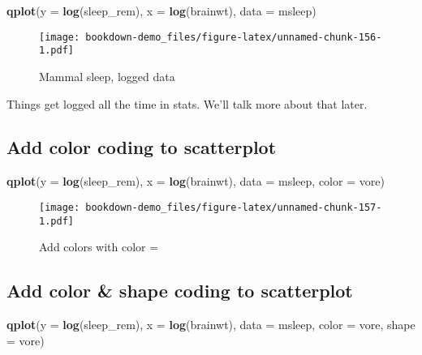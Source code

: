 \documentclass[]{book}
\newenvironment{Shaded}{\begin{snugshade}}{\end{snugshade}}
\newcommand{\KeywordTok}[1]{\textcolor[rgb]{0.13,0.29,0.53}{\textbf{#1}}}
\newcommand{\DataTypeTok}[1]{\textcolor[rgb]{0.13,0.29,0.53}{#1}}
\newcommand{\NormalTok}[1]{#1}
\theoremstyle{definition}
\theoremstyle{definition}
\theoremstyle{definition}
\theoremstyle{remark}
\begin{document}
\begin{Shaded}
\begin{Highlighting}[]
\KeywordTok{qplot}\NormalTok{(}\DataTypeTok{y =} \KeywordTok{log}\NormalTok{(sleep_rem),}
      \DataTypeTok{x =} \KeywordTok{log}\NormalTok{(brainwt), }
      \DataTypeTok{data =}\NormalTok{ msleep)}
\end{Highlighting}
\end{Shaded}

\begin{figure}
\centering
\texttt{[image: bookdown-demo\_files/figure-latex/unnamed-chunk-156-1.pdf]}
\caption{\label{fig:unnamed-chunk-156}Mammal sleep, logged data}
\end{figure}

Things get logged all the time in stats. We'll talk more about that
later.

\subsection{Add color coding to
scatterplot}\label{add-color-coding-to-scatterplot}

\begin{Shaded}
\begin{Highlighting}[]
\KeywordTok{qplot}\NormalTok{(}\DataTypeTok{y =} \KeywordTok{log}\NormalTok{(sleep_rem),}
      \DataTypeTok{x =} \KeywordTok{log}\NormalTok{(brainwt), }
      \DataTypeTok{data =}\NormalTok{ msleep,}
      \DataTypeTok{color =}\NormalTok{ vore)}
\end{Highlighting}
\end{Shaded}

\begin{figure}
\centering
\texttt{[image: bookdown-demo\_files/figure-latex/unnamed-chunk-157-1.pdf]}
\caption{\label{fig:unnamed-chunk-157}Add colors with color =}
\end{figure}

\subsection{Add color \& shape coding to
scatterplot}\label{add-color-shape-coding-to-scatterplot}

\begin{Shaded}
\begin{Highlighting}[]
\KeywordTok{qplot}\NormalTok{(}\DataTypeTok{y =} \KeywordTok{log}\NormalTok{(sleep_rem),}
      \DataTypeTok{x =} \KeywordTok{log}\NormalTok{(brainwt), }
      \DataTypeTok{data =}\NormalTok{ msleep,}
      \DataTypeTok{color =}\NormalTok{ vore,}
      \DataTypeTok{shape =}\NormalTok{ vore)}
\end{Highlighting}
\end{Shaded}
\end{document}
